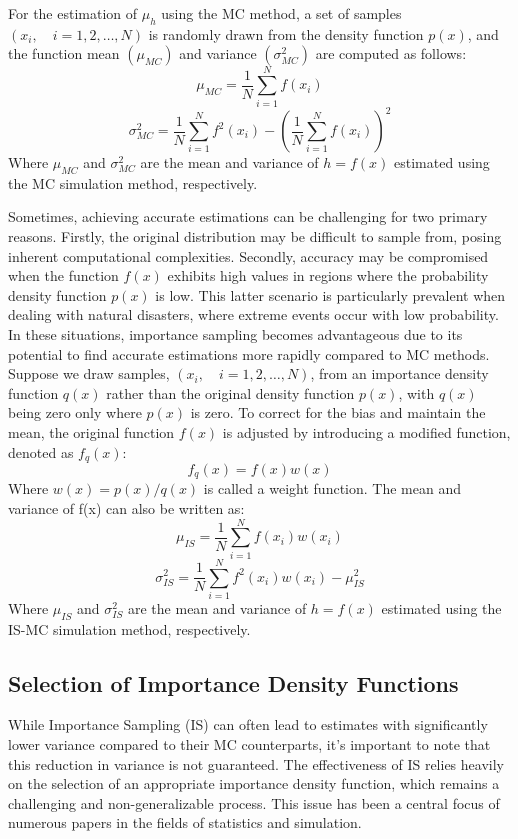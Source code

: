         For the estimation of $\mu_h$ using the MC method, a set of samples $(x_i,\quad i=1,2,…,N)$ is randomly drawn from the density function $p(x)$, and the function mean $(\mu_{MC})$ and variance $(\sigma_{MC}^2)$ are computed as follows:
        $$\mu_{MC}=\frac{1}{N}\sum_{i=1}^{N} f(x_i)$$
        $$\sigma_{MC}^2=\frac{1}{N}\sum_{i=1}^{N}f^2(x_i)-(\frac{1}{N}\sum_{i=1}^{N} f(x_i))^2$$
        Where $\mu_{MC}$ and $\sigma_{MC}^2$ are the mean and variance of $h=f(x)$ estimated using the MC simulation method, respectively.
        
        Sometimes, achieving accurate estimations can be challenging for two primary reasons. Firstly, the original distribution may be difficult to sample from, posing inherent computational complexities. Secondly, accuracy may be compromised when the function $f(x)$ exhibits high values in regions where the probability density function $p(x)$ is low. This latter scenario is particularly prevalent when dealing with natural disasters, where extreme events occur with low probability. In these situations, importance sampling becomes advantageous due to its potential to find accurate estimations more rapidly compared to MC methods. Suppose we draw samples, $(x_i, \quad i=1,2,…,N)$, from an importance density function $q(x)$ rather than the original density function $p(x)$, with $q(x)$ being zero only where $p(x)$ is zero. To correct for the bias and maintain the mean, the original function $f(x)$ is adjusted by introducing a modified function, denoted as $f_q(x)$:
        $$f_q(x)=f(x) w(x)$$
        Where $w(x)=p(x)/q(x)$ is called a weight function. 
        The mean and variance of f(x) can also be written as:
        $$\mu_{IS}=\frac{1}{N} \sum_{i=1}^{N}f(x_i)w(x_i)$$
        $$\sigma_{IS}^2=\frac{1}{N} \sum_{i=1}^N f^2(x_i)w(x_i)-\mu_{IS}^2$$
        Where $\mu_{IS}$ and $\sigma_{IS}^2$ are the mean and variance of $h=f(x)$ estimated using the IS-MC simulation method, respectively. 
        
    \subsection{Selection of Importance Density Functions}
        While Importance Sampling (IS) can often lead to estimates with significantly lower variance compared to their MC counterparts, it's important to note that this reduction in variance is not guaranteed. The effectiveness of IS relies heavily on the selection of an appropriate importance density function, which remains a challenging and non-generalizable process. This issue has been a central focus of numerous papers in the fields of statistics and simulation.
    
